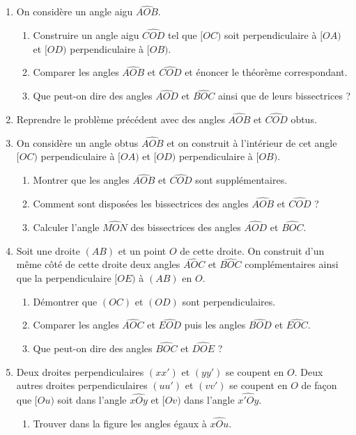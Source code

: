 \documentclass[12 pt]{report}
\theoremstyle{plain}
\newcounter{n}
\begin{document}
\begin{enumerate}
\item On considère un angle aigu $\widehat{AOB}$.\begin{enumerate}
\item Construire un angle aigu $\widehat{COD}$ tel que $[OC)$ soit perpendiculaire à $[OA)$ et $[OD)$ perpendiculaire à $[OB)$. 
\item Comparer les angles $\widehat{AOB}$ et $\widehat{COD}$ et énoncer le théorème
correspondant. 
\item Que peut-on dire des angles $\widehat{AOD}$ et $\widehat{BOC}$ ainsi que de 
leurs bissectrices ?
\end{enumerate}
\item Reprendre le problème précédent avec des angles $\widehat{AOB}$ et $\widehat{COD}$ obtus. 
\item On considère un angle obtus $\widehat{AOB}$ et on construit à l'intérieur de cet angle $[OC)$ perpendiculaire à $[OA)$ et $[OD)$ perpendiculaire à $[OB)$. \begin{enumerate}
\item Montrer que les angles $\widehat{AOB}$ et $\widehat{COD}$ sont supplémentaires.
\item Comment sont disposées les bissectrices des angles $\widehat{AOB}$ et $\widehat{COD}$ ? 
\item Calculer l'angle $\widehat{MON}$ des bissectrices des angles $\widehat{AOD}$ et $\widehat{BOC}$. 
\end{enumerate}
\item Soit une droite $(AB)$ et un point $O$ de cette droite. On construit d'un
même côté de cette droite deux angles $\widehat{AOC}$ et $\widehat{BOC}$ complémentaires ainsi que la perpendiculaire $[OE)$ à $(AB)$ en $O$. 
\begin{enumerate}
\item Démontrer que $(OC)$ et $(OD)$ sont perpendiculaires. 
\item Comparer les angles $\widehat{AOC}$ et $\widehat{EOD}$ puis les angles $\widehat{BOD}$ et $\widehat{EOC}$. 
\item Que peut-on dire des angles $\widehat{BOC}$ et $\widehat{DOE}$ ?
\end{enumerate}
\item Deux droites perpendiculaires $(xx')$ et $(yy')$ se coupent en $O$. Deux autres droites perpendiculaires $(uu')$ et $(vv')$ se coupent en $O$ de façon que $[Ou)$ soit dans l'angle $\widehat{xOy}$ et $[Ov)$ dans l'angle $\widehat{x'Oy}$. \begin{enumerate}
\item Trouver dans la figure les angles égaux à $\widehat{xOu}$. 

\end{enumerate}
\end{enumerate}
\end{document}

